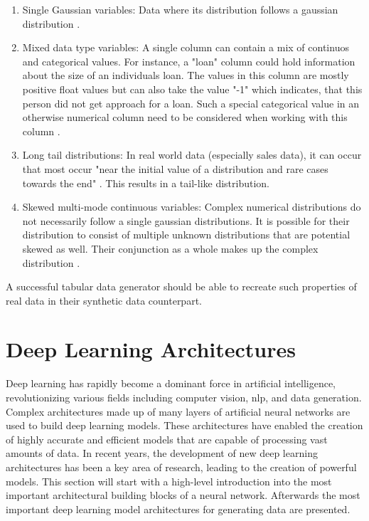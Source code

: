 \begin{enumerate}
    \item Single Gaussian variables: Data where its distribution follows a gaussian distribution \cite{zhao2022CTABGANEnhancingTabular}.
    \item Mixed data type variables: A single column can contain a mix of continuos and categorical values. 
    For instance, a "loan" column could hold information about the size of an individuals loan.
    The values in this column are mostly positive float values but can also take the value "-1" which indicates, that this person did not get approach for a loan.
    Such a special categorical value in an otherwise numerical column need to be considered when working with this column \cite{zhao2022CTABGANEnhancingTabular}.
    \item Long tail distributions: In real world data (especially sales data), it can occur that most occur "near the initial value of a distribution and rare cases towards the end" \cite[p. 3]{zhao2022CTABGANEnhancingTabular}.
    This results in a tail-like distribution.
    \item Skewed multi-mode continuous variables: Complex numerical distributions do not necessarily follow a single gaussian distributions.
    It is possible for their distribution to consist of multiple unknown distributions that are potential skewed as well. 
    Their conjunction as a whole makes up the complex distribution \cite{zhao2022CTABGANEnhancingTabular}.
\end{enumerate}

A successful tabular data generator should be able to recreate such properties of real data in their synthetic data counterpart.



\section{Deep Learning Architectures}
\label{ch:preliminaries-deepLearningArchitectures}

Deep learning has rapidly become a dominant force in artificial intelligence, revolutionizing various fields including computer vision, \gls{nlp}, and data generation. 
Complex architectures made up of many layers of artificial neural networks are used to build deep learning models.
These architectures have enabled the creation of highly accurate and efficient models that are capable of processing vast amounts of data. 
In recent years, the development of new deep learning architectures has been a key area of research, leading to the creation of powerful models.
This section will start with a high-level introduction into the most important architectural building blocks of a neural network.
Afterwards the most important deep learning \gls{model} architectures for generating data are presented.

